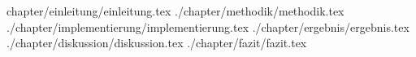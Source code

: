

\usepackage{import}


\date{16. September 2016}





\tableofcontents
\cleardoubleoddemptypage
{}
\setcounter{page}{1}
{chapter/einleitung/einleitung.tex}
{./chapter/methodik/methodik.tex}
{./chapter/implementierung/implementierung.tex}
{./chapter/ergebnis/ergebnis.tex}
{./chapter/diskussion/diskussion.tex}
{./chapter/fazit/fazit.tex}

\appendix %
\printbibliography


